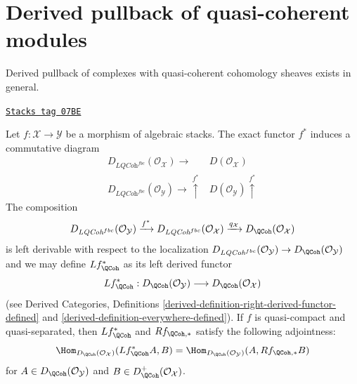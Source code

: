 \section{Derived pullback of quasi-coherent modules}
\label{stacks-perfect-section-derived-pullback}
Derived pullback of complexes with quasi-coherent cohomology
sheaves exists in general.

\begin{proposition}
\label{stacks-perfect-proposition-derived-pullback-quasi-coherent}
\href{https://stacks.math.columbia.edu/tag/07BE}{\texttt{Stacks tag 07BE}}

Let $f : \mathcal{X} \to \mathcal{Y}$ be a morphism of algebraic stacks.
The exact functor $f^*$ induces a commutative diagram
$$
\begin{array}{cc}D_{\textit{LQCoh}^{fbc}}(\mathcal{O}_\mathcal{X}) \longrightarrow & D(\mathcal{O}_\mathcal{X}) \\ D_{\textit{LQCoh}^{fbc}}(\mathcal{O}_\mathcal{Y})
\longrightarrow\overset{f^*}{\uparrow} & D(\mathcal{O}_\mathcal{Y}) \overset{f^*}{\uparrow}\end{array}
$$
The composition
$$
D_{\textit{LQCoh}^{fbc}}(\mathcal{O}_\mathcal{Y})
\xrightarrow{f^*}
D_{\textit{LQCoh}^{fbc}}(\mathcal{O}_\mathcal{X})
\xrightarrow{q_\mathcal{X}}
D_\QCoh(\mathcal{O}_\mathcal{X})
$$
is left derivable with respect to the localization
$D_{\textit{LQCoh}^{fbc}}(\mathcal{O}_\mathcal{Y}) \to
D_\QCoh(\mathcal{O}_\mathcal{Y})$
and we may define $Lf^*_\QCoh$ as its left derived functor
$$
Lf_\QCoh^* :
D_\QCoh(\mathcal{O}_\mathcal{Y})
\longrightarrow
D_\QCoh(\mathcal{O}_\mathcal{X})
$$
(see
Derived Categories,
Definitions \ref{derived-definition-right-derived-functor-defined} and
\ref{derived-definition-everywhere-defined}). If $f$ is quasi-compact
and quasi-separated, then $Lf^*_\QCoh$ and $Rf_{\QCoh, *}$
satisfy the following adjointness:
$$
\Hom_{D_\QCoh(\mathcal{O}_\mathcal{X})}(Lf^*_\QCoh A, B)
=
\Hom_{D_\QCoh(\mathcal{O}_\mathcal{Y})}(A, Rf_{\QCoh, *}B)
$$
for $A \in D_\QCoh(\mathcal{O}_\mathcal{Y})$ and
$B \in D^{+}_\QCoh(\mathcal{O}_\mathcal{X})$.
\end{proposition}

